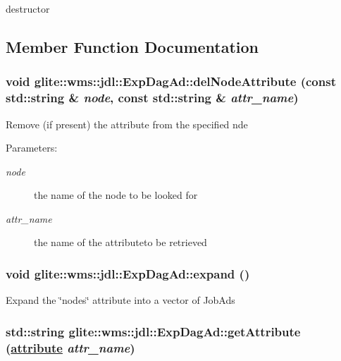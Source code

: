 destructor 

\subsection{Member Function Documentation}
\hypertarget{classglite_1_1wms_1_1jdl_1_1ExpDagAd_a12}{
\subsubsection[delNodeAttribute]{\setlength{\rightskip}{0pt plus 5cm}void glite::wms::jdl::Exp\-Dag\-Ad::del\-Node\-Attribute (const std::string \& {\em node}, const std::string \& {\em attr\_\-name})}}
\label{classglite_1_1wms_1_1jdl_1_1ExpDagAd_a12}


Remove (if present) the attribute from the specified nde \begin{Desc}
\item[Parameters:]
\begin{description}
\item[{\em node}]the name of the node to be looked for \item[{\em attr\_\-name}]the name of the attributeto be retrieved \end{description}
\end{Desc}
\hypertarget{classglite_1_1wms_1_1jdl_1_1ExpDagAd_a20}{
\subsubsection[expand]{\setlength{\rightskip}{0pt plus 5cm}void glite::wms::jdl::Exp\-Dag\-Ad::expand ()}}
\label{classglite_1_1wms_1_1jdl_1_1ExpDagAd_a20}


Expand the \char`\"{}nodes\char`\"{} attribute into a vector of Job\-Ads \hypertarget{classglite_1_1wms_1_1jdl_1_1ExpDagAd_a15}{
\subsubsection[getAttribute]{\setlength{\rightskip}{0pt plus 5cm}std::string glite::wms::jdl::Exp\-Dag\-Ad::get\-Attribute (\hyperlink{classglite_1_1wms_1_1jdl_1_1ExpDagAd_w10}{attribute} {\em attr\_\-name})}}
\label{classglite_1_1wms_1_1jdl_1_1ExpDagAd_a15}


